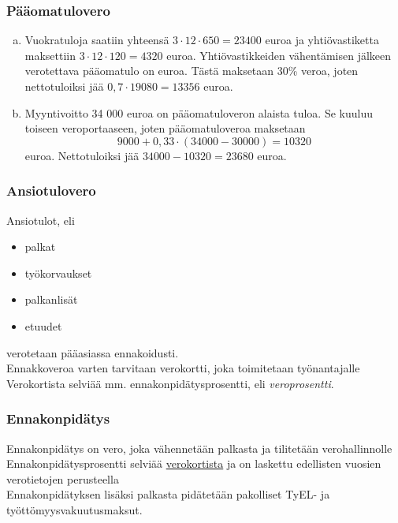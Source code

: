 \documentclass[]{beamer}\usepackage[]{graphicx}\usepackage[]{color}
\newcommand{\pblock}{\\ \vspace{0.5cm}\pause}
\begin{document}
\begin{frame}
\frametitle{Pääomatulovero}
	\begin{ratkaisu}
		\begin{enumerate}[(a)]
			\item Vuokratuloja saatiin yhteensä \pause \(3\cdot12\cdot650 = 23 400\) euroa ja yhtiövastiketta maksettiin \pause  \(3\cdot12\cdot120 = 4320\) euroa. \pause Yhtiövastikkeiden vähentämisen jälkeen verotettava pääomatulo on  euroa. Tästä maksetaan 30\% veroa, joten nettotuloiksi jää \pause \(0,7\cdot19080=13356\) euroa.\pause
			\item Myyntivoitto 34 000 euroa on pääomatuloveron alaista tuloa. \pause Se kuuluu toiseen veroportaaseen, joten pääomatuloveroa maksetaan\pause
			\[
				9000 + 0,33\cdot(34000-30000) = 10320
			\]
			euroa. \pause Nettotuloiksi jää \(34 000-10320 = 23680\) euroa.
		\end{enumerate} 
	\end{ratkaisu}
\end{frame}

\begin{frame}
  \frametitle{Ansiotulovero}
  \pause
  Ansiotulot, eli
  \begin{itemize}
    \item palkat
    \item työkorvaukset
    \item palkanlisät
    \item etuudet
  \end{itemize}
  verotetaan pääasiassa ennakoidusti.
  \pblock
  Ennakkoveroa varten tarvitaan verokortti, joka toimitetaan työnantajalle
  \pblock 
  Verokortista selviää mm. ennakonpidätysprosentti, eli \emph{veroprosentti}.
\end{frame}

\begin{frame}
  \frametitle{Ennakonpidätys}
  \pause
  Ennakonpidätys on vero, joka vähennetään palkasta ja tilitetään verohallinnolle
  \pblock
  Ennakonpidätysprosentti selviää \href{http://portal.vero.fi/Demo_VKV2015/Sivut/Login.aspx?demoasiakas=d1b73ac40dc9436a86f4b0683cd30d24&culture=fi-FI}{verokortista} ja on laskettu edellisten vuosien verotietojen perusteella
  \pblock
  Ennakonpidätyksen lisäksi palkasta pidätetään pakolliset TyEL- ja työttömyysvakuutusmaksut.
\end{frame}
\end{document}

